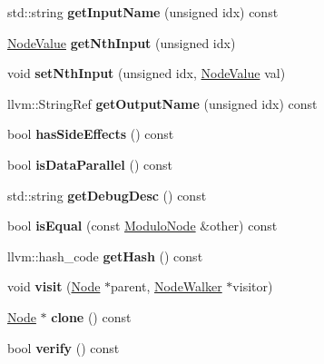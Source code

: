 \begin{DoxyCompactItemize}
std\+::string {\bfseries get\+Input\+Name} (unsigned idx) const
\item 
\mbox{\label{classglow_1_1_modulo_node_a8be142fa4b1e4a89a9c90fb131e163cb}} 
\hyperlink{structglow_1_1_node_value}{Node\+Value} {\bfseries get\+Nth\+Input} (unsigned idx)
\item 
\mbox{\label{classglow_1_1_modulo_node_a05c65506ef3fcdab0b25cb98df10be10}} 
void {\bfseries set\+Nth\+Input} (unsigned idx, \hyperlink{structglow_1_1_node_value}{Node\+Value} val)
\item 
\mbox{\label{classglow_1_1_modulo_node_ac9895a8e5bc0284de8739563bdf0fdfc}} 
llvm\+::\+String\+Ref {\bfseries get\+Output\+Name} (unsigned idx) const
\item 
\mbox{\label{classglow_1_1_modulo_node_a291aa3d6af00aa54ef6b57aa7cef50cd}} 
bool {\bfseries has\+Side\+Effects} () const
\item 
\mbox{\label{classglow_1_1_modulo_node_a379d842fd7d391c782518e4f00e2cdc8}} 
bool {\bfseries is\+Data\+Parallel} () const
\item 
\mbox{\label{classglow_1_1_modulo_node_af955cf435001a8e760359fea1e5e871e}} 
std\+::string {\bfseries get\+Debug\+Desc} () const
\item 
\mbox{\label{classglow_1_1_modulo_node_ad1a286b54217b524b0e573b639876e10}} 
bool {\bfseries is\+Equal} (const \hyperlink{classglow_1_1_modulo_node}{Modulo\+Node} \&other) const
\item 
\mbox{\label{classglow_1_1_modulo_node_ac10ab30b51e023a56d9d81ee2b8d2856}} 
llvm\+::hash\+\_\+code {\bfseries get\+Hash} () const
\item 
\mbox{\label{classglow_1_1_modulo_node_ab4e4842aeaf3ea39366bbe619447eb14}} 
void {\bfseries visit} (\hyperlink{classglow_1_1_node}{Node} $\ast$parent, \hyperlink{classglow_1_1_node_walker}{Node\+Walker} $\ast$visitor)
\item 
\mbox{\label{classglow_1_1_modulo_node_a83bd83064887f5a0ca18c4ea713815c4}} 
\hyperlink{classglow_1_1_node}{Node} $\ast$ {\bfseries clone} () const
\item 
\mbox{\label{classglow_1_1_modulo_node_a706d7522ec58e709b89db5ac69df1e7a}} 
bool {\bfseries verify} () const
\end{DoxyCompactItemize}
